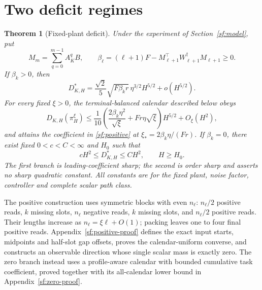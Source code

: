 \documentclass[journal]{IEEEtran}
\newtheorem{theorem}{Theorem}
\begin{document}
\section{Two deficit regimes}\label{sf:results}
\begin{theorem}[Fixed-plant deficit]\label{sf:two-regime}
Under the experiment of Section~\ref{sf:model}, put
\begin{equation}\label{sf:penalty}
M_m=\sum_{q=0}^{m-1}A_K^qB,\qquad
\beta_\ell=(\ell+1)F-M_{\ell+1}^\top W_{\ell+1}^\dagger M_{\ell+1}\ge0.
\end{equation}
If $\beta_k>0$, then
\begin{equation}\label{sf:positive}
D_{K,H}^*=\frac{\sqrt2}{5}\sqrt{F\beta_k r}\,\eta^{3/2}H^{5/2}
+o(H^{5/2}).
\end{equation}
For every fixed $\xi>0$, the terminal-balanced calendar described below obeys
\begin{equation}\label{sf:upper}
D_{K,H}(\pi_H^\xi)\le\frac1{10}
\left(\frac{2\beta_k\eta^2}{\sqrt\xi}+Fr\eta\sqrt\xi\right)H^{5/2}
+O_\xi(H^2),
\end{equation}
and attains the coefficient in \eqref{sf:positive} at
$\xi_*=2\beta_k\eta/(Fr)$. If $\beta_k=0$, there exist fixed
$0<c<C<\infty$ and $H_0$ such that
\begin{equation}\label{sf:zero}
cH^2\le D_{K,H}^*\le CH^2,\qquad H\ge H_0.
\end{equation}
The first branch is leading-coefficient sharp; the second is order sharp and
asserts no sharp quadratic constant. All constants are for the fixed plant,
noise factor, controller and complete scalar path class.
\end{theorem}

The positive construction uses symmetric blocks with even $n_\ell$:
$n_\ell/2$ positive reads, $k$ missing slots, $n_\ell$ negative reads,
$k$ missing slots, and $n_\ell/2$ positive reads. Their lengths increase as
$n_\ell=\xi\ell+O(1)$; packing leaves one to four final positive reads.
Appendix~\ref{sf:positive-proof} defines the exact input starts, midpoints
and half-slot gap offsets, proves the calendar-uniform converse, and constructs
an observable direction whose single scalar mass is exactly zero.
The zero branch instead uses a profile-aware calendar with bounded cumulative
task coefficient, proved together with its all-calendar lower bound in
Appendix~\ref{sf:zero-proof}.
\end{document}
